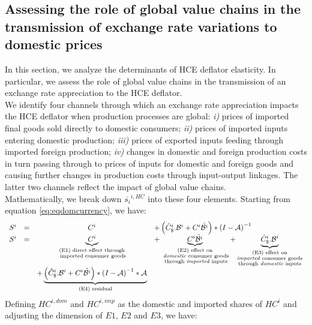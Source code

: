 \documentclass[11pt,a4paper]{paper} %
\begin{document}
\subsection{Assessing the role of global value chains in the transmission of exchange rate variations to domestic prices}
In this section, we analyze the determinants of HCE deflator elasticity. 
In particular, we assess the role of global value chains in the transmission of an exchange rate appreciation to the HCE deflator.\\ 
We identify four channels through which an exchange rate appreciation impacts the HCE deflator when production processes are global: \textit{i)} prices of imported ﬁnal goods sold directly to domestic consumers;
\textit{ii)} prices of imported inputs entering domestic production; 
\textit{iii)} prices of exported inputs feeding through imported foreign production;
\textit{iv)} changes in domestic and foreign production costs in turn passing through to prices of inputs for domestic and foreign goods and causing further changes in production costs through input-output linkages.
The latter two channels reflect the impact of global value chains.\\
Mathematically, we break down $\overline{s_{i}}^{i,HC}$ into these four elements.
Starting from equation \ref{eq:eqdomcurrency}, we have:
\begin{equation}
\begin{array}{lccl}
	S^ i&=&C^i	&+ \left(\hat{C}^i_\$.{\cal B}^i+{C^i}{\tilde{{\cal B}^i}}\right)*{{(I-{\cal A})}^{-1}} \\
	S^i &=&\underbrace{C^i}_{\substack{\text{(E1) direct effect through} \\ \text{ imported consumer goods}}}&+ \underbrace{{C^i}{\tilde{{\cal B}^i}}}_{\substack{\text{(E2) effect on} \\ \text{ \emph{domestic} consumer goods} \\ \text{ through \emph{imported} inputs}}}  + \underbrace{\hat{C}^i_\$.{\cal B}^i}_{\substack{\text{(E3)  effect on} \\ \text{\emph{imported} consumer goods} \\ \text{through \emph{domestic} inputs}}} \\ &&+\underbrace {\left( \hat{C}^i_\$.{\cal B}^i + {C^i}{\tilde{{\cal B}^i}}\right)*{{(I-{\cal A})}^{-1}}*{\cal A}}_{\text{(E4) residual}} \\
\end{array}
\label{eq:decomp}
\end{equation}
Defining $HC^{i,dom}$ and $HC^{i,imp}$ as the domestic and imported shares of $HC^i$ and adjusting the dimension of $E1$, $E2$ and $E3$, we have:
\end{document}
